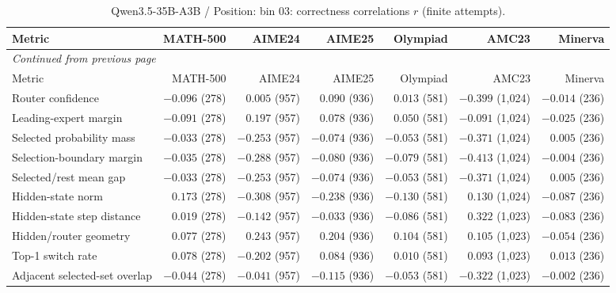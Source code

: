 \begingroup\scriptsize\setlength{\tabcolsep}{4pt}
\begin{longtable}{@{}lrrrrrr@{}}
\caption{Qwen3.5-35B-A3B / Position: bin 03: correctness correlations $r$ (finite attempts).}\label{tab:multi-qwen-position-bin_03}\\
\toprule
Metric & MATH-500 & AIME24 & AIME25 & Olympiad & AMC23 & Minerva \\
\midrule\endfirsthead
\multicolumn{7}{l}{\textit{Continued from previous page}}\\
\toprule
Metric & MATH-500 & AIME24 & AIME25 & Olympiad & AMC23 & Minerva \\
\midrule\endhead
\bottomrule\endfoot
Router confidence & $-0.096$ (278) & $0.005$ (957) & $0.090$ (936) & $0.013$ (581) & $-0.399$ (1,024) & $-0.014$ (236) \\
Leading-expert margin & $-0.091$ (278) & $0.197$ (957) & $0.078$ (936) & $0.050$ (581) & $-0.091$ (1,024) & $-0.025$ (236) \\
Selected probability mass & $-0.033$ (278) & $-0.253$ (957) & $-0.074$ (936) & $-0.053$ (581) & $-0.371$ (1,024) & $0.005$ (236) \\
Selection-boundary margin & $-0.035$ (278) & $-0.288$ (957) & $-0.080$ (936) & $-0.079$ (581) & $-0.413$ (1,024) & $-0.004$ (236) \\
Selected/rest mean gap & $-0.033$ (278) & $-0.253$ (957) & $-0.074$ (936) & $-0.053$ (581) & $-0.371$ (1,024) & $0.005$ (236) \\
Hidden-state norm & $0.173$ (278) & $-0.308$ (957) & $-0.238$ (936) & $-0.130$ (581) & $0.130$ (1,024) & $-0.087$ (236) \\
Hidden-state step distance & $0.019$ (278) & $-0.142$ (957) & $-0.033$ (936) & $-0.086$ (581) & $0.322$ (1,023) & $-0.083$ (236) \\
Hidden/router geometry & $0.077$ (278) & $0.243$ (957) & $0.204$ (936) & $0.104$ (581) & $0.105$ (1,023) & $-0.054$ (236) \\
Top-1 switch rate & $0.078$ (278) & $-0.202$ (957) & $0.084$ (936) & $0.010$ (581) & $0.093$ (1,023) & $0.013$ (236) \\
Adjacent selected-set overlap & $-0.044$ (278) & $-0.041$ (957) & $-0.115$ (936) & $-0.053$ (581) & $-0.322$ (1,023) & $-0.002$ (236) \\
\end{longtable}\endgroup

